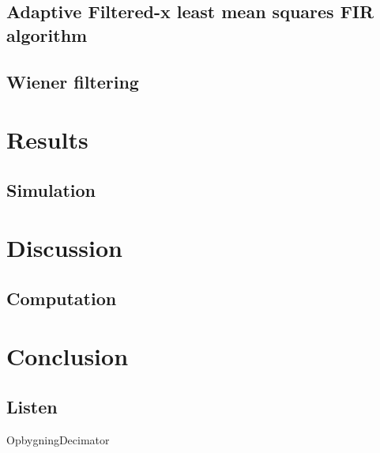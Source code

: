 \subsection{Adaptive Filtered-x least mean squares FIR algorithm}

\subsection{Wiener filtering}

\section{Results}

\subsection{Simulation}


\section{Discussion}

\subsection{Computation}

\section{Conclusion}

\subsection{Listen}

\begin{frame}{Opbygning}{Decimator}	

\end{frame}